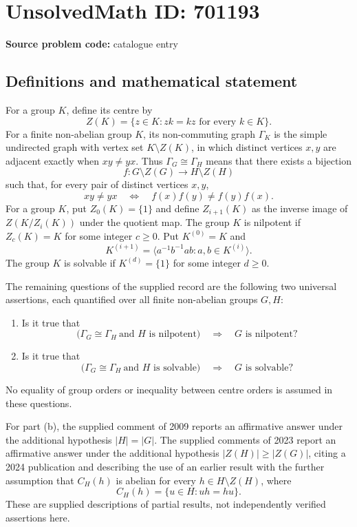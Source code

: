\documentclass[11pt]{article}
\begin{document}
\section*{UnsolvedMath ID: 701193}
\textbf{Source problem code:} catalogue entry
\subsection{Definitions and mathematical statement}
For a group \(K\), define its centre by
\[
Z(K)=\{z\in K:zk=kz\text{ for every }k\in K\}.
\]
For a finite non-abelian group \(K\), its non-commuting graph \(\Gamma_K\) is the simple undirected graph with vertex set \(K\setminus Z(K)\), in which distinct vertices \(x,y\) are adjacent exactly when \(xy\ne yx\). Thus \(\Gamma_G\cong\Gamma_H\) means that there exists a bijection
\[
f:G\setminus Z(G)\longrightarrow H\setminus Z(H)
\]
such that, for every pair of distinct vertices \(x,y\),
\[
xy\ne yx\quad\Longleftrightarrow\quad f(x)f(y)\ne f(y)f(x).
\]
For a group \(K\), put \(Z_0(K)=\{1\}\) and define \(Z_{i+1}(K)\) as the inverse image of \(Z(K/Z_i(K))\) under the quotient map. The group \(K\) is nilpotent if \(Z_c(K)=K\) for some integer \(c\geq0\). Put \(K^{(0)}=K\) and
\[
K^{(i+1)}=\langle a^{-1}b^{-1}ab:a,b\in K^{(i)}\rangle.
\]
The group \(K\) is solvable if \(K^{(d)}=\{1\}\) for some integer \(d\geq0\).

The remaining questions of the supplied record are the following two universal assertions, each quantified over all finite non-abelian groups \(G,H\):
\begin{enumerate}
\item[(b)] Is it true that
\[
\bigl(\Gamma_G\cong\Gamma_H\ \text{and }H\text{ is nilpotent}\bigr)
\quad\Longrightarrow\quad G\text{ is nilpotent}?
\]
\item[(c)] Is it true that
\[
\bigl(\Gamma_G\cong\Gamma_H\ \text{and }H\text{ is solvable}\bigr)
\quad\Longrightarrow\quad G\text{ is solvable}?
\]
\end{enumerate}
No equality of group orders or inequality between centre orders is assumed in these questions.

For part (b), the supplied comment of 2009 reports an affirmative answer under the additional hypothesis \(|H|=|G|\). The supplied comments of 2023 report an affirmative answer under the additional hypothesis \(|Z(H)|\geq |Z(G)|\), citing a 2024 publication and describing the use of an earlier result with the further assumption that \(C_H(h)\) is abelian for every \(h\in H\setminus Z(H)\), where
\[
C_H(h)=\{u\in H:uh=hu\}.
\]
These are supplied descriptions of partial results, not independently verified assertions here.
\end{document}
